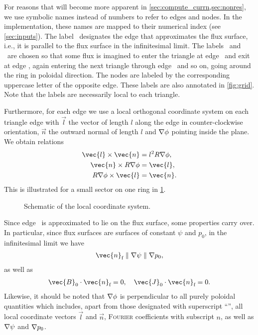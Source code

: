 For reasons that will become more apparent in \cref{sec:compute_currn,sec:nonres}, we use symbolic names instead of numbers to refer to edges and nodes. In the implementation, these names are mapped to their numerical index (see \cref{sec:inputs}). The label \fs\ designates the edge that approximates the flux surface, i.e., it is parallel to the flux surface in the infinitesimal limit. The labels \inw\ and \out\ are chosen so that some flux is imagined to enter the triangle at edge \inw\ and exit at edge \out, again entering the next triangle through edge \inw\ and so on, going around the ring in poloidal direction. The nodes are labeled by the corresponding uppercase letter of the opposite edge. These labels are also annotated in \cref{fig:grid}. Note that the labels are necessarily local to each triangle.

Furthermore, for each edge we use a local orthogonal coordinate system on each triangle edge with $\vec{l}$ the vector of length $l$ along the edge in counter-clockwise orientation, $\vec{n}$ the outward normal of length $l$ and $\grad \phi$ pointing inside the plane. We obtain relations
\begin{align}
  \vec{l} \times \vec{n} &= l^{2} R \grad \phi, \label{eq:edge_phi} \\
  \vec{n} \times R \grad \phi &= \vec{l}, \label{eq:edge_l} \\
  R \grad \phi \times \vec{l} &= \vec{n}. \label{eq:edge_n}
\end{align}
This is illustrated for a small sector on one ring in \cref{fig:local_coordinates}.
\begin{figure}[bth]
  \centering
  
  \caption{Schematic of the local coordinate system.}
  \label{fig:local_coordinates}
\end{figure}

Since edge \fs\ is approximated to lie on the flux surface, some properties carry over. In particular, since flux surfaces are surfaces of constant $\psi$ and $p_{0}$, in the infinitesimal limit we have
\begin{gather}
  \vec{n}_{\fs} \parallel \grad \psi \parallel \grad p_{0},
\end{gather}
as well as
\begin{gather}
  \vec{B}_{0} \cdot \vec{n}_{\fs} = 0, \quad \vec{J}_{0} \cdot \vec{n}_{\fs} = 0.
\end{gather}
Likewise, it should be noted that $\grad \phi$ is perpendicular to all purely poloidal quantities which includes, apart from those designated with superscript \enquote{\pol}, all local coordinate vectors $\vec{l}$ and $\vec{n}$, \textsc{Fourier} coefficients with subscript $n$, as well as $\nabla \psi$ and $\nabla p_{0}$.

